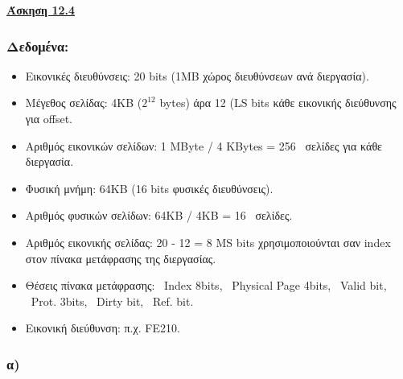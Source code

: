 \documentclass{article}
\begin{document}

\text{   }
\vspace{-1.0cm}
\begin{center}
\setlength{\fboxrule}{2pt}
\setlength{\fboxsep}{15pt} 
\fbox
{
      {}
}
\end{center}
\vspace{1cm}




\begin{center}
    {\underline{\Large \textbf{Άσκηση 12.4}}}
\end{center}
\vspace{0.12345cm}



\subsubsection*{\textbf{Δεδομένα:}}
\begin{itemize}
    \item Εικονικές διευθύνσεις: 20 \textlatin{bits} (1\textlatin{MB} χώρος διευθύνσεων ανά διεργασία).
    \item Μέγεθος σελίδας: 4\textlatin{KB} ($2^{12}$ \textlatin{bytes}) άρα 12 (\textlatin{LS bits} κάθε εικονικής διεύθυνσης για \textlatin{offset}.
    \item Αριθμός εικονικών σελίδων: 1 \textlatin{MByte} / 4 \textlatin{KBytes} = 256 \ σελίδες για κάθε διεργασία. 
    \item Φυσική μνήμη: 64\textlatin{KB} (16 \textlatin{bits} φυσικές διευθύνσεις).
    \item Αριθμός φυσικών σελίδων: 64\textlatin{KB} / 4\textlatin{KB} = 16 \ σελίδες.
    \item Αριθμός εικονικής σελίδας: 20 - 12 = 8 \textlatin{MS bits} χρησιμοποιούνται
σαν \textlatin{index} στον πίνακα μετάφρασης της διεργασίας.
    \item Θέσεις πίνακα μετάφρασης: \ \textlatin{Index 8bits}, \ \textlatin{Physical Page 4bits}, \ \textlatin{Valid bit}, \ \textlatin{Prot. 3bits}, \ \textlatin{Dirty bit}, \ \textlatin{Ref. bit}.
    \item Εικονική διεύθυνση: π.χ. \textlatin{FE210}.
\end{itemize}


\subsubsection*{\textbf{α)}}
\end{document}
